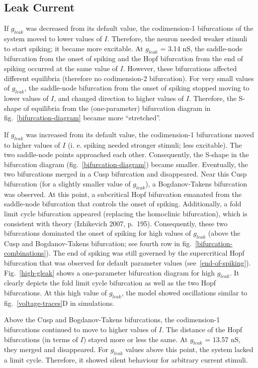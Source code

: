 \documentclass[12pt,a4paper,]{report}
\begin{document}
\subsection{Leak Current}\label{leak-current}

If $g_{leak}$ was decreased from its default value, the codimension-1
bifurcations of the system moved to lower values of $I$. Therefore, the
neuron needed weaker stimuli to start spiking; it became more excitable.
At $g_{leak}$ = 3.14 nS, the saddle-node bifurcation from the onset of
spiking and the Hopf bifurcation from the end of spiking occurred at the
same value of $I$. However, these bifurcations affected different
equilibria (therefore no codimension-2 bifurcation). For very small
values of $g_{leak}$, the saddle-node bifurcation from the onset of
spiking stopped moving to lower values of $I$, and changed direction to
higher values of $I$. Therefore, the S-shape of equilibria from the
(one-parameter) bifurcation diagram in fig.~\ref{bifurcation-diagram}
became more ``stretched''.

If $g_{leak}$ was increased from its default value, the codimension-1
bifurcations moved to higher values of $I$ (i. e. spiking needed
stronger stimuli; less excitable). The two saddle-node points approached
each other. Consequently, the S-shape in the bifurcation diagram
(fig.~\ref{bifurcation-diagram}) became smaller. Eventually, the two
bifurcations merged in a Cusp bifurcation and disappeared. Near this
Cusp bifurcation (for a slightly smaller value of $g_{leak}$), a
Bogdanov-Takens bifurcation was observed. At this point, a subcritical
Hopf bifurcation emanated from the saddle-node bifurcation that controls
the onset of spiking. Additionally, a fold limit cycle bifurcation
appeared (replacing the homoclinic bifurcation), which is consistent
with theory (Izhikevich 2007, p.~195). Consequently, these two
bifurcations dominated the onset of spiking for high values of
$g_{leak}$ (above the Cusp and Bogdanov-Takens bifurcation; see fourth
row in fig.~\ref{bifurcation-combinations}). The end of spiking was
still governed by the supercritical Hopf bifurcation that was observed
for default parameter values (see~\ref{end-of-spiking}).
Fig.~\ref{high-gleak} shows a one-parameter bifurcation diagram for high
$g_{leak}$. It clearly depicts the fold limit cycle bifurcation as well
as the two Hopf bifurcations. At this high value of $g_{leak}$, the
model showed oscillations similar to fig.~\ref{voltage-traces}D in
simulations.

Above the Cusp and Bogdanov-Takens bifurcations, the codimension-1
bifurcations continued to move to higher values of $I$. The distance of
the Hopf bifurcations (in terms of $I$) stayed more or less the same. At
$g_{leak}$ = 13.57 nS, they merged and disappeared. For $g_{leak}$
values above this point, the system lacked a limit cycle. Therefore, it
showed silent behaviour for arbitrary current stimuli.
\end{document}

